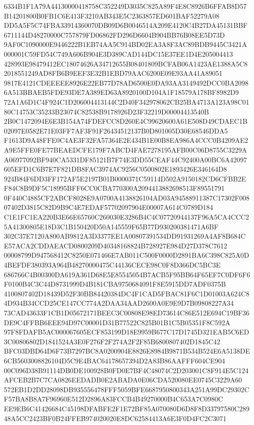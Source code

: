 \documentclass[UTF8,fontset=fandol,zihao=-4,a4paper]{ctexart}
\begin{document}
{{6334B1F1A79A44130000418758C352249D3035C825A89F4E8C8926B6FFAB8D57B14201800B0FB1C6E413F3210AB343E5C2363857ED601BAF52279A08
DD5A5F5C74FBA33914360070DB09D6B0046514A209E4120C4B27DA45131BBF6711144D48270000C757879FD06862FD296D6604B904BB76B08EE5D73D
9AF0C1090000E9446222B1EB74AA5C914BD02EA3A8F3AC89BDB9445C3421A000001C59FD54C749A606B904E3D389CAD144DC15E37EE1D4E205004413
428993E98479412EC18074626A34712655B08401809BCFAB06A1423AE1388A5C82018551249AD8FB6B9EEF3E32B1EBD79AAC6200E09E93AA41A89051
9817E4121CDEEEEE8926E22EB77D78AD6500E0DA93AA3149492DCC0BA20986A513BBAEB5FDE93DE7A389ED63A8920100D104A1F18579A178BF8982D9
72A1A6D1C4F924C1D206004413144C2D40F342978062CB25BA4713A123A98C0180C14753C35233B23074C82538B9178926D23F32219D00004413540B
2B0C1472094E6E3B154A74FDEFCC8D260E4C99620600A61E508D49CDAEC1B02097E0582E71E03FF7AF3F91F26434512137B0D801005D30E68546DDA5
F1613D9A48FFE0C4AE3F32FA57364E2E434B1E00B8EA986A4CCC0B4209AE2A9E5FFE0FE77BEAEDCFE179F7ABCD4FAE7278195AFB00C06D8755C3229A
A06977092BF940CA5331DF85121B7F74E3DD55CEAF44C92400A00BC6A42097605EFD1C6B7E7F821DB8FAC3974AC9256C0500802E1893426E346164D8
924B84F6DD3FF172AF5E2197B01B0000371C59114D502A9150182CD6CFBB2EF84C8B9DF5C18995BFF6CC0CBA770300A2094413882698513F89551791
0F440C4885CF2ABCF8028E9A0700A4138826104AD03A94588911387C17302F00807402D3815C82D9B9C4E7EDAF57702097904E00007A614C0789D184
C1E1FC1EA220B3E66E65760C260030E3286B4C4C07720944137F96A5CA4CCC25A41300805E18D3C1B150420D50A145559F65B77D930200381471A6BF
302C37E7120A800AB9812A3D3377EE1A00807391534DD91931269A4AF8B684CE57ACA2CDDAEACD0800209D40348168824B728927E984D27D378C7612
00008799D947568412C8250E071466E7AB011C500F0000D2891BA6C398C825A0D4BEFDF380393A964B48270000475C44136CECE98C0F8D366DC5BC3E
686766C4B00300DA619A361D68E5E85545054B7ACB5F95BB64F65EF7C0DF6F6F0100B4C3C44D8731999D4B181CBA9750684091F8E5915DD7ADF0375B
4100807402D18439D52F30BB84420384DC4F1CAD5FBAC81F6C1D01003A624C84D934B34CCD25CE147CC774A2DAA34AAD2600A0E9E9D7B09808227A34
73CAD43633F1CB1D05672171BEEC3C00808E98ED73614C86E512E694C19BF36DE9C4FFBB6EEE94D97C00001D31B77522C825B01B1C5B05351F8C592A
97F8FDAFB5AC000067605ECF853199D18E9959B677C17D1745D321EAB5C6ED3C00806802D1841524A3E0F276F2F274A2F2F85B6800807402D1845C42
BFC03DBD64D6F73B7297BC8A0200904E8826E8984B9871B534B524E6A5138DE6CB5603008826104D5C9E4BAC64178657394D2A83B86AAFFF604CE904
00C096D38B91114DB0DE100928B0FD0E7BF4C48074C2D203001C8F914E5C124AFCEB2B7C7CA0826EEDADB0E2ABADA0E06CDA520080EE0745C3229A60
572EB1D2DD28098DB935556478FFF5059BFE6687950800343A251A99DC29302CF57BA8B8A7F96960E512D2896A83FCCB4B49270000B4C653A7C0980C
EE9EB6C41426684C45198DFABFE2F1E72BF85A070080D6D8F8D33797580C28948A5CC2423BF0B24FFEB974020020E8DC62584413A6E3F0D4FC2C3071
}}
\end{document}
